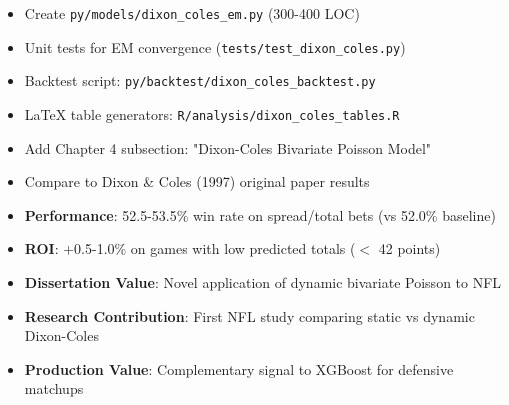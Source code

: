 \begin{itemize}
  \item {} Create \texttt{py/models/dixon\_coles\_em.py} (300-400 LOC)
  \item {} Unit tests for EM convergence (\texttt{tests/test\_dixon\_coles.py})
  \item {} Backtest script: \texttt{py/backtest/dixon\_coles\_backtest.py}
  \item {} LaTeX table generators: \texttt{R/analysis/dixon\_coles\_tables.R}
  \item {} Add Chapter 4 subsection: "Dixon-Coles Bivariate Poisson Model"
  \item {} Compare to Dixon \& Coles (1997) original paper results
\end{itemize}

\begin{itemize}
  \item \textbf{Performance}: 52.5-53.5\% win rate on spread/total bets (vs 52.0\% baseline)
  \item \textbf{ROI}: +0.5-1.0\% on games with low predicted totals ($<$ 42 points)
  \item \textbf{Dissertation Value}: Novel application of dynamic bivariate Poisson to NFL
  \item \textbf{Research Contribution}: First NFL study comparing static vs dynamic Dixon-Coles
  \item \textbf{Production Value}: Complementary signal to XGBoost for defensive matchups
\end{itemize}


